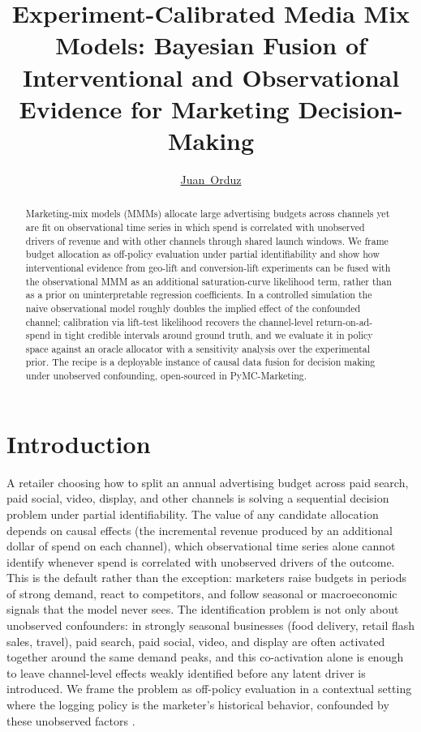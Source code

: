 \documentclass{uai2026} %
\title{Experiment-Calibrated Media Mix Models: Bayesian Fusion of Interventional and Observational Evidence for Marketing Decision-Making}
\author[1]{\href{mailto:juan.orduz@pymc-labs.com?Subject=Your UAI 2026 paper}{Juan~Orduz}{}}
\affil[1]{%
    PyMC Labs\\
    Principal Data Scientist
}
\begin{document}
\maketitle

\begin{abstract}
  Marketing-mix models (MMMs) allocate large advertising budgets across channels yet are fit on observational time series in which spend is correlated with unobserved drivers of revenue and with other channels through shared launch windows.
  We frame budget allocation as off-policy evaluation under partial identifiability and show how interventional evidence from geo-lift and conversion-lift experiments can be fused with the observational MMM as an additional saturation-curve likelihood term, rather than as a prior on uninterpretable regression coefficients.
  In a controlled simulation the naive observational model roughly doubles the implied effect of the confounded channel; calibration via lift-test likelihood recovers the channel-level return-on-ad-spend in tight credible intervals around ground truth, and we evaluate it in policy space against an oracle allocator with a sensitivity analysis over the experimental prior.
  The recipe is a deployable instance of causal data fusion for decision making under unobserved confounding, open-sourced in PyMC-Marketing.
\end{abstract}

\section{Introduction}\label{sec:intro}

A retailer choosing how to split an annual advertising budget across paid search, paid social, video, display, and other channels is solving a sequential decision problem under partial identifiability.
The value of any candidate allocation depends on causal effects (the incremental revenue produced by an additional dollar of spend on each channel), which observational time series alone cannot identify whenever spend is correlated with unobserved drivers of the outcome.
This is the default rather than the exception: marketers raise budgets in periods of strong demand, react to competitors, and follow seasonal or macroeconomic signals that the model never sees.
The identification problem is not only about unobserved confounders: in strongly seasonal businesses (food delivery, retail flash sales, travel), paid search, paid social, video, and display are often activated together around the same demand peaks, and this co-activation alone is enough to leave channel-level effects weakly identified before any latent driver is introduced.
We frame the problem as off-policy evaluation in a contextual setting where the logging policy is the marketer's historical behavior, confounded by these unobserved factors \citep{dudik2014ope}.
\end{document}
